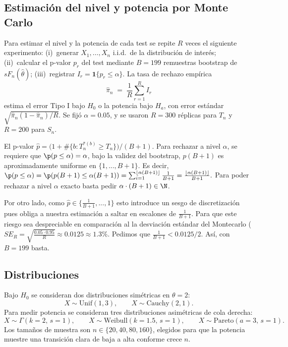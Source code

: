 
\subsection{Estimación del nivel y potencia por Monte Carlo}

Para estimar el nivel y la potencia de cada test se repite $R$ veces el siguiente experimento: (i)~generar $X_1,\dots,X_n$ i.i.d.\ de la distribución de interés; (ii)~calcular el p-valor $p_r$ del test mediante $B=199$ remuestras bootstrap de $sF_n(\hat\theta)$; (iii)~registrar $I_r=\mathbf{1}\{p_r\le\alpha\}$. La tasa de rechazo empírica
\[
\hat\pi_n \;=\; \frac{1}{R}\sum_{r=1}^{R} I_r
\]
estima el error Tipo I bajo $H_0$ o la potencia bajo $H_a$, con error estándar $\sqrt{\hat\pi_n(1-\hat\pi_n)/R}$. Se fijó $\alpha=0.05$, y se usaron $R=300$ réplicas para $T_n$ y $R=200$ para $S_n$.

\begin{observacion}
El p-valor $\hat p=\bigl(1+\#\{b:T_n^{*(b)}\ge T_n\}\bigr)/(B+1)$. Para rechazar a nivel $\alpha$, se requiere que $\p( p\leq \alpha) = \alpha$, bajo la validez del bootstrap, $p(B+1)$ es aproximadamente uniforme en $\{1,...,B+1\}$. Es decir, $\p( p \leq \alpha) = \p(p(B+1) \leq \alpha(B+1)) = \sum_{i=1}^{\lfloor \alpha(B+1) \rfloor} \frac{1}{B+1} = \frac{\lfloor \alpha(B+1) \rfloor}{B+1}.$ Para poder rechazar a nivel $\alpha$ exacto basta pedir $\alpha\cdot(B+1) \in \N$.

Por otro lado,  como $\hat{p}\in \{\frac{1}{B+1},...,1\}$ esto introduce un sesgo de discretización pues obliga a nuestra estimación a saltar en escalones de $\frac{1}{B+1}$. Para que este riesgo sea despreciable en comparación al la desviación estándar del Montecarlo ($SE_R= \sqrt{\frac{0.05\cdot0.95}{R}} \approx 0.0125 \approx 1.3 \%$. Pedimos que $\frac{1}{B+1}< 0.0125/2.$ Así, con $B= 199$ basta.
\end{observacion}


\subsection{Distribuciones}

Bajo $H_0$ se consideran dos distribuciones simétricas en $\theta=2$:
\[
X \sim \mathrm{Unif}(1,3), \qquad X \sim \mathrm{Cauchy}(2,1).
\]
Para medir potencia se consideran tres distribuciones asimétricas de cola derecha:
\[
X \sim \Gamma(k{=}2,\,s{=}1), \qquad X \sim \mathrm{Weibull}(k{=}1.5,\,s{=}1), \qquad X \sim \mathrm{Pareto}(a{=}3,\,s{=}1).
\]
Los tamaños de muestra son $n\in\{20,40,80,160\}$, elegidos para que la potencia muestre una transición clara de baja a alta conforme crece $n$.

